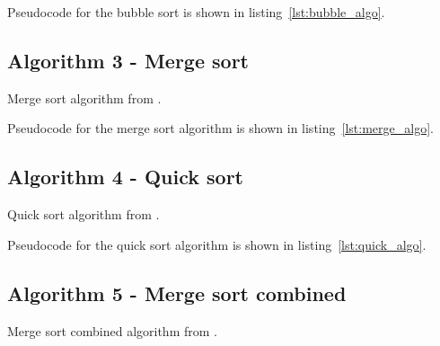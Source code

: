 \documentclass[sigconf, nonacm, natbib, screen, balance=False]{acmart}
\begin{document}
Pseudocode for the bubble sort is shown in listing~\ref{lst:bubble_algo}. 

\subsection{Algorithm 3 - Merge sort}\label{sec:algo2}

\begin{listing}
  \caption{Merge sort algorithm from \citet[Ch.~2.1]{CLRS_2009}.}
  \label{lst:merge_algo}

  \begin{codebox}

  \end{codebox}
\end{listing}

Pseudocode for the merge sort algorithm is shown in listing~\ref{lst:merge_algo}. 

\subsection{Algorithm 4 - Quick sort}\label{sec:algo2}

\begin{listing}
  \caption{Quick sort algorithm from \citet[Ch.~2.1]{CLRS_2009}.}
  \label{lst:quick_algo}
  
  \begin{codebox}

  \end{codebox}
\end{listing}

Pseudocode for the quick sort algorithm is shown in 
listing~\ref{lst:quick_algo}. 

\subsection{Algorithm 5 - Merge sort combined}\label{sec:algo2}

\begin{listing}
  \caption{Merge sort combined algorithm from \citet[Ch.~2.1]{CLRS_2009}.}
  \label{lst:mergecombined_algo}
  
  \begin{codebox}

  \end{codebox}
\end{listing}
\end{document}
